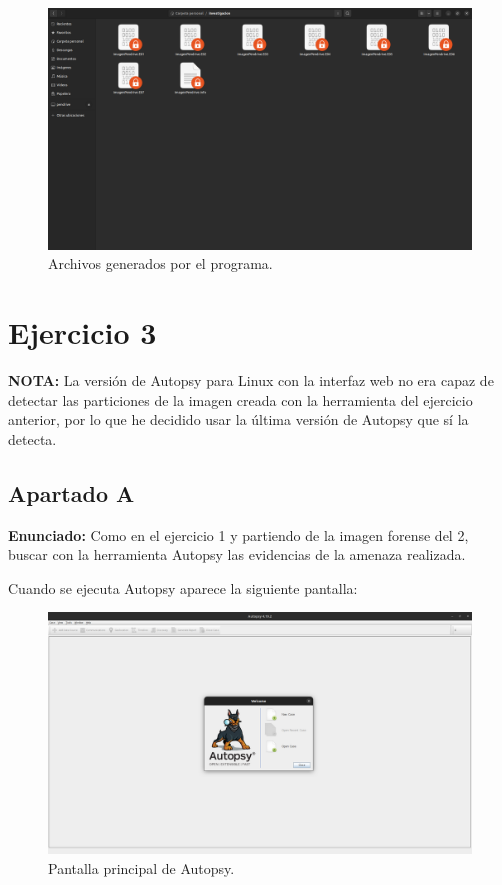 \documentclass{article}
\begin{document}
\begin{figure}[H]
    \centering
    \includegraphics[width=\textwidth]{imagenes/Captura desde 2022-12-02 19-50-53.png}
    \caption{Archivos generados por el programa.}
\end{figure}

\newpage

{}
\section*{Ejercicio 3}

\textbf{NOTA: }La versión de Autopsy para Linux con la interfaz web no era capaz de detectar las particiones de la imagen creada con la herramienta del ejercicio anterior, por lo que he decidido usar la última versión de Autopsy que sí la detecta.


{}
\subsection*{Apartado A}

\textbf{Enunciado: } Como en el ejercicio 1 y partiendo de la imagen forense del 2, buscar con la herramienta Autopsy las evidencias de la amenaza realizada.

\bigskip

Cuando se ejecuta Autopsy aparece la siguiente pantalla:

\begin{figure}[H]
    \centering
    \includegraphics[width=\textwidth]{imagenes/Captura desde 2022-12-03 21-22-16.png}
    \caption{Pantalla principal de Autopsy.}
\end{figure}
\end{document}
